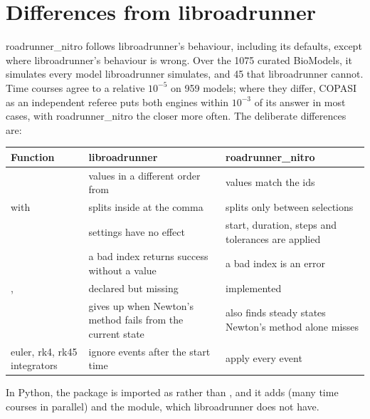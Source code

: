 \chapter{Differences from libroadrunner}
\label{ch:differences}

roadrunner\_nitro follows libroadrunner's behaviour, including its defaults, except where libroadrunner's
behaviour is wrong. Over the 1075 curated BioModels, it simulates every model libroadrunner simulates, and 45
that libroadrunner cannot. Time courses agree to a relative $10^{-5}$ on 959 models; where they differ, COPASI as
an independent referee puts both engines within $10^{-3}$ of its answer in most cases, with roadrunner\_nitro
the closer more often. The deliberate differences are:

\begin{center}
\begin{tabularx}{\textwidth}{L{0.36\textwidth}YY}
\toprule
Function & libroadrunner & roadrunner\_nitro \\
\midrule
{} & values in a different order from  & values match the ids \\
 with  & splits inside  at the comma & splits only
  between selections \\
 & settings have no effect & start, duration, steps and tolerances are applied \\
 & a bad index returns success without a value & a bad
  index is an error \\
,  & declared but missing & implemented \\
 & gives up when Newton's method fails from the current state & also finds steady states
  Newton's method alone misses \\
euler, rk4, rk45 integrators & ignore events after the start time & apply every event \\
\bottomrule
\end{tabularx}
\end{center}

In Python, the package is imported as  rather than , and it adds
 (many time courses in parallel) and the  module, which libroadrunner does not
have.
